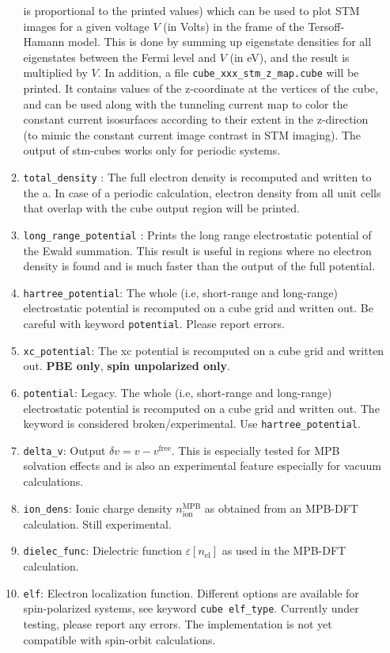 \begin{itemize}
\begin{enumerate}
    is proportional to the printed values)
    which can be used to
    plot STM images for a given voltage $V$ (in Volts) in the frame
    of the Tersoff-Hamann model.
    This is done by summing up eigenstate densities
    for all eigenstates between the Fermi level and $V$ (in eV),
    and the result is multiplied by $V$.
    In addition, a file \texttt{cube\_xxx\_stm\_z\_map.cube}
    will be printed. It contains values of the z-coordinate at the
    vertices of the cube, and can be used along with the tunneling current map
    to color the constant current isosurfaces according to their extent in
    the z-direction (to mimic the constant current image contrast in STM
    imaging). The output of stm-cubes works only for periodic systems.
  \item \texttt{total\_density} : The full electron density is
    recomputed and written to the a. In case of a periodic calculation,
    electron density from all unit cells that overlap with the cube
    output region will be printed.
  \item \texttt{long\_range\_potential} : Prints the long range
    electrostatic potential of the Ewald summation. This result is
    useful in regions where no electron density is found and is much
    faster than the output of the full potential.
  \item \texttt{hartree\_potential}: The whole (i.e, short-range and
    long-range) electrostatic potential is recomputed on a cube grid
    and written out. Be careful with keyword
    \texttt{potential}. Please report errors.
  \item \texttt{xc\_potential}: The xc potential is recomputed on a
    cube grid and written out. \textbf{PBE only},  \textbf{spin unpolarized only}.
  \item \texttt{potential}: Legacy. The whole (i.e, short-range and
    long-range) electrostatic potential is recomputed on a cube grid
    and written out. The keyword is considered
    broken/experimental. Use \texttt{hartree\_potential}.
  \item \texttt{delta\_v}: Output $\delta v = v - v^\mathrm{free}$. This is especially tested for MPB solvation effects and is also an experimental feature especially for vacuum calculations.
  \item \texttt{ion\_dens}: Ionic charge density $n_\mathrm{ion}^\mathrm{MPB}$ as obtained from an MPB-DFT calculation. Still experimental.
  \item \texttt{dielec\_func}: Dielectric function $\varepsilon[n_\mathrm{el}]$ as used in the MPB-DFT calculation.
  \item \texttt{elf}: Electron localization function. Different options are available
for spin-polarized systems, see keyword \texttt{cube elf\_type}.
Currently under testing, please report any errors. The implementation is not yet compatible
with spin-orbit calculations.
\end{enumerate}


\end{itemize}
